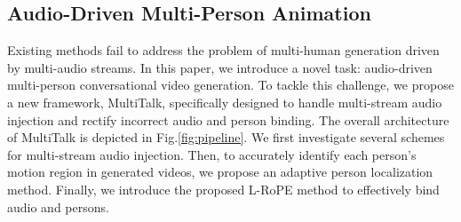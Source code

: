 \documentclass{article}
\begin{document}
\subsection{Audio-Driven Multi-Person Animation}
\label{sec:dual-human}






Existing methods fail to address the problem of multi-human generation driven by multi-audio streams. In this paper, we introduce a novel task: audio-driven multi-person conversational video generation. To tackle this challenge, we propose a new framework, MultiTalk, specifically designed to handle multi-stream audio injection and rectify incorrect audio and person binding. The overall architecture of MultiTalk is depicted in Fig.\ref{fig:pipeline}. We first investigate several schemes for multi-stream audio injection. Then, to accurately identify each person's motion region in generated videos, we propose an adaptive person localization method. Finally, we introduce the proposed L-RoPE method to effectively bind audio and persons.
\end{document}
